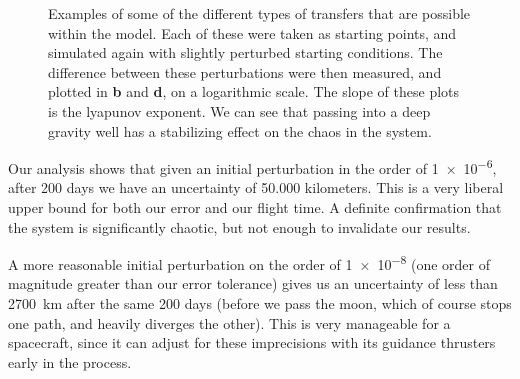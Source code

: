 \begin{figure}
{        \label{fig:long_leto_slope}
    }
    \caption{Examples of some of the different types of transfers that are possible within the model. Each of these were taken as starting points, and simulated again with slightly perturbed starting conditions. The difference between these perturbations were then measured, and plotted in \textbf{b} and \textbf{d}, on a logarithmic scale. The slope of these plots is the lyapunov exponent. We can see that passing into a deep gravity well has a stabilizing effect on the chaos in the system.}
    \label{fig:lyapunov}
\end{figure} 

Our analysis shows that given an initial perturbation in the order of \num{1e-6}, after 200 days we have an uncertainty of 50.000 kilometers. This is a very liberal upper bound for both our error and our flight time. A definite confirmation that the system is significantly chaotic, but not enough to invalidate our results. 

A more reasonable initial perturbation on the order of \num{1e-8} (one order of magnitude greater than our error tolerance) gives us an uncertainty of less than \SI{2700}{km} after the same 200 days (before we pass the moon, which of course stops one path, and heavily diverges the other). This is very manageable for a spacecraft, since it can adjust for these imprecisions with its guidance thrusters early in the process.




